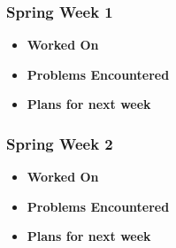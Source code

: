 \documentclass[compsoc,draftclsnofoot,onecolumn,10pt]{IEEEtran}
\begin{document}
\subsubsection{Spring Week 1}
\begin{itemize}
    \item {\textbf{Worked On}}
    \begin{itemize}
        
    \end{itemize}

    \item {\textbf{Problems Encountered}}
    \begin{itemize}
        
    \end{itemize}

    \item{\textbf{Plans for next week}}
    \begin{itemize}
        
    \end{itemize}

\end{itemize}

\subsubsection{Spring Week 2}
\begin{itemize}
    \item {\textbf{Worked On}}
    \begin{itemize}
        
    \end{itemize}

    \item {\textbf{Problems Encountered}}
    \begin{itemize}
        
    \end{itemize}

    \item{\textbf{Plans for next week}}
    \begin{itemize}
        
    \end{itemize}

\end{itemize}
\end{document}
